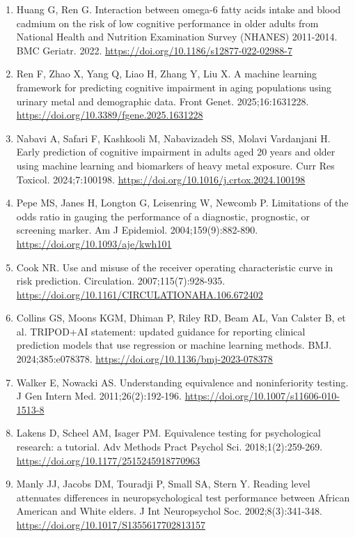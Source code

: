 \documentclass[12pt]{article}
\begin{document}
\begin{singlespace}
\begin{enumerate}
\item Huang G, Ren G. Interaction between omega-6 fatty acids intake and blood cadmium on the risk of low cognitive performance in older adults from National Health and Nutrition Examination Survey (NHANES) 2011-2014. BMC Geriatr. 2022. \url{https://doi.org/10.1186/s12877-022-02988-7}

\item Ren F, Zhao X, Yang Q, Liao H, Zhang Y, Liu X. A machine learning framework for predicting cognitive impairment in aging populations using urinary metal and demographic data. Front Genet. 2025;16:1631228. \url{https://doi.org/10.3389/fgene.2025.1631228}

\item Nabavi A, Safari F, Kashkooli M, Nabavizadeh SS, Molavi Vardanjani H. Early prediction of cognitive impairment in adults aged 20 years and older using machine learning and biomarkers of heavy metal exposure. Curr Res Toxicol. 2024;7:100198. \url{https://doi.org/10.1016/j.crtox.2024.100198}

\item Pepe MS, Janes H, Longton G, Leisenring W, Newcomb P. Limitations of the odds ratio in gauging the performance of a diagnostic, prognostic, or screening marker. Am J Epidemiol. 2004;159(9):882-890. \url{https://doi.org/10.1093/aje/kwh101}

\item Cook NR. Use and misuse of the receiver operating characteristic curve in risk prediction. Circulation. 2007;115(7):928-935. \url{https://doi.org/10.1161/CIRCULATIONAHA.106.672402}

\item Collins GS, Moons KGM, Dhiman P, Riley RD, Beam AL, Van Calster B, et al. TRIPOD+AI statement: updated guidance for reporting clinical prediction models that use regression or machine learning methods. BMJ. 2024;385:e078378. \url{https://doi.org/10.1136/bmj-2023-078378}

\item Walker E, Nowacki AS. Understanding equivalence and noninferiority testing. J Gen Intern Med. 2011;26(2):192-196. \url{https://doi.org/10.1007/s11606-010-1513-8}

\item Lakens D, Scheel AM, Isager PM. Equivalence testing for psychological research: a tutorial. Adv Methods Pract Psychol Sci. 2018;1(2):259-269. \url{https://doi.org/10.1177/2515245918770963}

\item Manly JJ, Jacobs DM, Touradji P, Small SA, Stern Y. Reading level attenuates differences in neuropsychological test performance between African American and White elders. J Int Neuropsychol Soc. 2002;8(3):341-348. \url{https://doi.org/10.1017/S1355617702813157}

\end{enumerate}
\end{singlespace}
\end{document}
